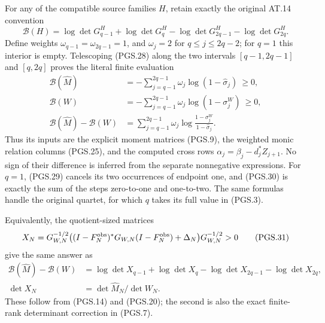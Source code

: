 For any of the compatible source families \(H\), retain exactly
the original AT.14 convention
\[
 \mathcal B(H)=\log\det G^H_{q-1}+\log\det G^H_q
                 -\log\det G^H_{2q-1}-\log\det G^H_{2q}.
\tag{PGS.29}\label{GraphV2:eq:pgs-four-signs}
\]
Define weights \(\omega_{q-1}=\omega_{2q-1}=1\), and
\(\omega_j=2\) for \(q\le j\le2q-2\); for \(q=1\)
this interior is empty. Telescoping (PGS.28) along the two
intervals \([q-1,2q-1]\) and \([q,2q]\) proves the literal
finite evaluation
\[
\begin{aligned}
 \mathcal B(\widehat M)
       &=-\sum_{j=q-1}^{2q-1}\omega_j
                          \log(1-\widehat\sigma_j)\ \ge0,\\
 \mathcal B(W)
       &=-\sum_{j=q-1}^{2q-1}\omega_j
                          \log(1-\sigma_j^W)\ \ge0,\\
 \mathcal B(\widehat M)-\mathcal B(W)
       &=\sum_{j=q-1}^{2q-1}\omega_j
                  \log\frac{1-\sigma_j^W}{1-\widehat\sigma_j}.
\end{aligned}
\tag{PGS.30}\label{GraphV2:eq:pgs-four-rank-one}
\]
Thus its inputs are the explicit moment matrices (PGS.9), the
weighted monic relation columns (PGS.25), and the computed cross
rows \(\alpha_j=\beta_j-d_j^*Z_{j+1}\). No sign of their
difference is inferred from the separate nonnegative expressions.
For \(q=1\), (PGS.29) cancels its two occurrences of endpoint
one, and (PGS.30) is exactly the sum of the steps zero-to-one and
one-to-two. The same formulas handle the original quartet, for
which \(q\) takes its full value in (PGS.3).

Equivalently, the quotient-sized matrices
\[
 X_N=G_{W,N}^{-1/2}
       \bigl((I-F_N^{\rm obs})^*G_{W,N}(I-F_N^{\rm obs})
                           +\Delta_N\bigr)G_{W,N}^{-1/2}>0
\tag{PGS.31}\label{GraphV2:eq:pgs-quotient-ratio}
\]
give the same answer as
\[
\begin{aligned}
 \mathcal B(\widehat M)-\mathcal B(W)
   &=\log\det X_{q-1}+\log\det X_q
        -\log\det X_{2q-1}-\log\det X_{2q},\\
 \det X_N&=\det\widehat M_N/\det W_N.
\end{aligned}
\tag{PGS.32}\label{GraphV2:eq:pgs-four-ratio}
\]
These follow from (PGS.14) and (PGS.20); the second is also
the exact finite-rank determinant correction in (PGS.7).

